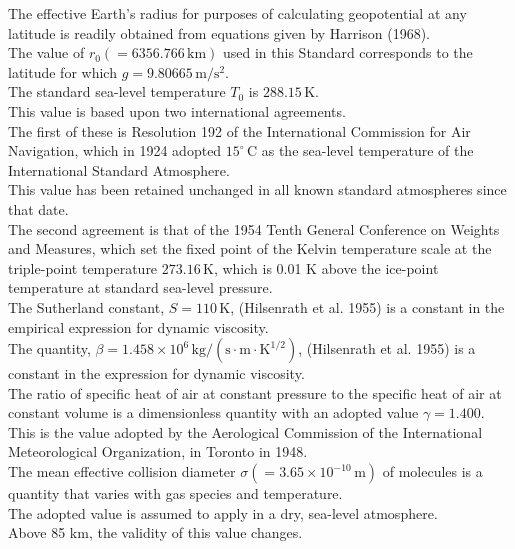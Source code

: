\documentclass{article}
\begin{document}
The effective Earth's radius for purposes of calculating geopotential at any latitude is readily obtained from equations given by Harrison (1968).\\

The value of \(r_0 (= 6356.766 \, \mathrm{km})\) used in this Standard corresponds to the latitude for which \(g = 9.80665 \, \mathrm{m/s^2}\).\\

The standard sea-level temperature \(T_0\) is \(288.15 \, \mathrm{K}\).\\
This value is based upon two international agreements.\\
The first of these is Resolution 192 of the International Commission for Air Navigation, which in 1924 adopted \(15^\circ \, \mathrm{C}\) as the sea-level temperature of the International Standard Atmosphere.\\
This value has been retained unchanged in all known standard atmospheres since that date.\\
The second agreement is that of the 1954 Tenth General Conference on Weights and Measures, which set the fixed point of the Kelvin temperature scale at the triple-point temperature \(273.16 \, \mathrm{K}\), which is 0.01 K above the ice-point temperature at standard sea-level pressure.\\

The Sutherland constant, \(S = 110 \, \mathrm{K}\), (Hilsenrath et al. 1955) is a constant in the empirical expression for dynamic viscosity.\\

The quantity, \(\beta = 1.458 \times 10^{6} \, \mathrm{kg/(s \cdot m \cdot K^{1/2})}\), (Hilsenrath et al. 1955) is a constant in the expression for dynamic viscosity.\\

The ratio of specific heat of air at constant pressure to the specific heat of air at constant volume is a dimensionless quantity with an adopted value \(\gamma = 1.400\).\\
This is the value adopted by the Aerological Commission of the International Meteorological Organization, in Toronto in 1948.\\

The mean effective collision diameter \(\sigma (= 3.65 \times 10^{-10} \, \mathrm{m})\) of molecules is a quantity that varies with gas species and temperature.\\
The adopted value is assumed to apply in a dry, sea-level atmosphere.\\
Above 85 km, the validity of this value changes.\\
\end{document}
